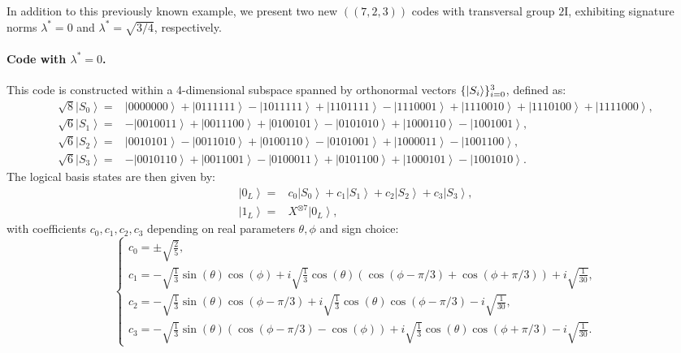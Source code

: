 \documentclass[8pt]{article}
\theoremstyle{definition}
\begin{document}
In addition to this previously known example, we present two new \(((7,2,3))\) codes with transversal group \(2\mathrm{I}\), exhibiting signature norms \(\lambda^* = 0\) and \(\lambda^* = \sqrt{3/4}\), respectively.

\paragraph{Code with \texorpdfstring{$\lambda^* = 0$}{λ* = 0}.}This code is constructed within a 4-dimensional subspace spanned by orthonormal vectors \(\{\ket{S_i}\}_{i=0}^3\), defined as:
\begin{align*}
    \sqrt{8}\left|S_{0}\right\rangle = & \left|0000000\right\rangle +\left|0111111\right\rangle -\left|1011111\right\rangle +\left|1101111\right\rangle -\left|1110001\right\rangle +\left|1110010\right\rangle +\left|1110100\right\rangle +\left|1111000\right\rangle , \\
    \sqrt{6}\left|S_{1}\right\rangle = & -\left|0010011\right\rangle +\left|0011100\right\rangle +\left|0100101\right\rangle -\left|0101010\right\rangle +\left|1000110\right\rangle -\left|1001001\right\rangle ,                                                        \\
    \sqrt{6}\left|S_{2}\right\rangle = & \left|0010101\right\rangle -\left|0011010\right\rangle +\left|0100110\right\rangle -\left|0101001\right\rangle +\left|1000011\right\rangle -\left|1001100\right\rangle ,                                                         \\
    \sqrt{6}\left|S_{3}\right\rangle = & -\left|0010110\right\rangle +\left|0011001\right\rangle -\left|0100011\right\rangle +\left|0101100\right\rangle +\left|1000101\right\rangle -\left|1001010\right\rangle .
\end{align*}
The logical basis states are then given by:
\begin{align*}
    \left|0_{L}\right\rangle = & c_{0}\left|S_{0}\right\rangle +c_{1}\left|S_{1}\right\rangle +c_{2}\left|S_{2}\right\rangle +c_{3}\left|S_{3}\right\rangle , \\
    \left|1_{L}\right\rangle = & X^{\otimes7}\left|0_{L}\right\rangle,
\end{align*}
with coefficients \(c_0, c_1, c_2, c_3\) depending on real parameters \(\theta, \phi\) and sign choice:
\[ \begin{cases}
        c_{0}=\pm\sqrt{\frac{2}{5}},                                                                                                                        \\
        c_{1}=-\sqrt{\frac{1}{3}}\sin(\theta)\cos(\phi)+i\sqrt{\frac{1}{3}}\cos(\theta)\left(\cos(\phi-\pi/3)+\cos(\phi+\pi/3)\right)+i\sqrt{\frac{1}{30}}, \\
        c_{2}=-\sqrt{\frac{1}{3}}\sin(\theta)\cos(\phi-\pi/3)+i\sqrt{\frac{1}{3}}\cos(\theta)\cos(\phi-\pi/3)-i\sqrt{\frac{1}{30}},                         \\
        c_{3}=-\sqrt{\frac{1}{3}}\sin(\theta)\left(\cos(\phi-\pi/3)-\cos(\phi)\right)+i\sqrt{\frac{1}{3}}\cos(\theta)\cos(\phi+\pi/3)-i\sqrt{\frac{1}{30}}.
    \end{cases} \]
\end{document}
